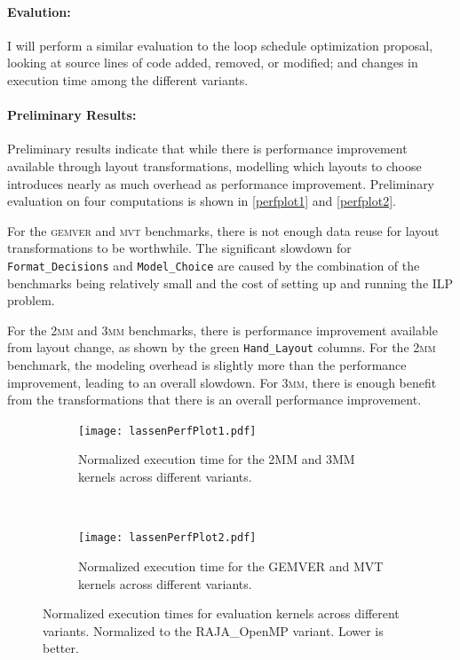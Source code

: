 \documentclass{article}
\begin{document}
\paragraph{Evalution:}

I will perform a similar evaluation to the loop schedule optimization proposal, looking at source lines of code added, removed, or modified; and changes in execution time among the different variants.


\paragraph{Preliminary Results:}

Preliminary results indicate that while there is performance improvement available through layout transformations, modelling which layouts to choose introduces nearly as much overhead as performance improvement. 
Preliminary evaluation on four computations is shown in \autoref{perfplot1} and \autoref{perfplot2}. 

For the \textsc{gemver} and \textsc{mvt} benchmarks, there is not enough data reuse for layout transformations to be worthwhile. 
The significant slowdown for \verb.Format_Decisions. and \verb.Model_Choice. are caused by the combination of the benchmarks being relatively small and the cost of setting up and running the ILP problem.

For the \textsc{2mm} and \textsc{3mm} benchmarks, there is performance improvement available from layout change, as shown by the green \verb.Hand_Layout. columns. 
For the \textsc{2mm} benchmark, the modeling overhead is slightly more than the performance improvement, leading to an overall slowdown. 
For \textsc{3mm}, there is enough benefit from the transformations that there is an overall performance improvement.



\begin{figure}
\begin{subfigure}{0.45\textwidth}
\texttt{[image: lassenPerfPlot1.pdf]}
\caption{Normalized execution time for the 2MM and 3MM kernels across different variants.}
\label{perfplot1}
\end{subfigure}
~~
\begin{subfigure}{0.45\textwidth}
    \texttt{[image: lassenPerfPlot2.pdf]}
    \caption{Normalized execution time for the GEMVER and MVT kernels across different variants.}
    \label{perfplot2}
    \end{subfigure}

\caption{Normalized execution times for evaluation kernels across different variants. Normalized to the RAJA\_OpenMP variant. Lower is better.}
\end{figure}
\end{document}
